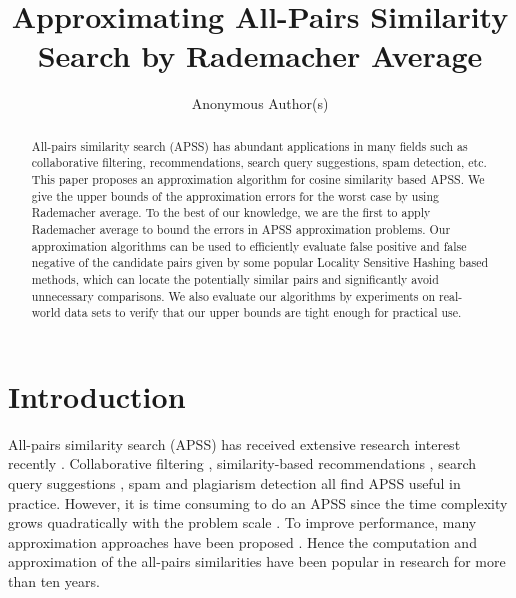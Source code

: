 \documentclass[sigconf,anonymous]{acmart}
\begin{document}
\title{Approximating All-Pairs Similarity Search by Rademacher Average}
\author{Anonymous Author(s)}
\date{}


\begin{abstract}
All-pairs similarity search (APSS) has abundant applications in many fields such as collaborative filtering, recommendations, search query suggestions, spam detection, etc.
This paper proposes an approximation algorithm for cosine similarity based APSS. 
We give the upper bounds of the approximation errors for the worst case by using Rademacher average.
To the best of our knowledge, we are the first to apply Rademacher average to bound the errors in APSS approximation problems.
{\color{black} Our approximation algorithms can be used to efficiently evaluate false positive and false negative of the candidate pairs given by some popular Locality Sensitive Hashing based methods, which can locate the potentially similar pairs and significantly avoid unnecessary comparisons.}
We also evaluate our algorithms by experiments on real-world data sets to verify that our upper bounds are tight enough for practical use.
\end{abstract}
\maketitle

\section{Introduction}
All-pairs similarity search (APSS) has received extensive research interest recently \cite{BMS07,Xia16,ATY13,TAJY14}. Collaborative filtering \cite{SKK01}, similarity-based recommendations \cite{RV97}, search query suggestions \cite{CJP08}, spam and plagiarism detection \cite{CDG07,LCH06} all find APSS useful in practice. However, it is time consuming to do an APSS since the time complexity grows quadratically with the problem scale \cite{BMS07,ATY13,TAJY14}. To improve performance, many approximation approaches have been proposed \cite{GIM99,FKS03,IM98,Char02,LRU14}. Hence the computation \cite{BMS07,DHM04,Xia16,ATY13,TAJY14} and approximation \cite{LRU14,GIM99,FKS03,IM98,Char02} of the all-pairs similarities have been popular in research for more than ten years.
\end{document}
